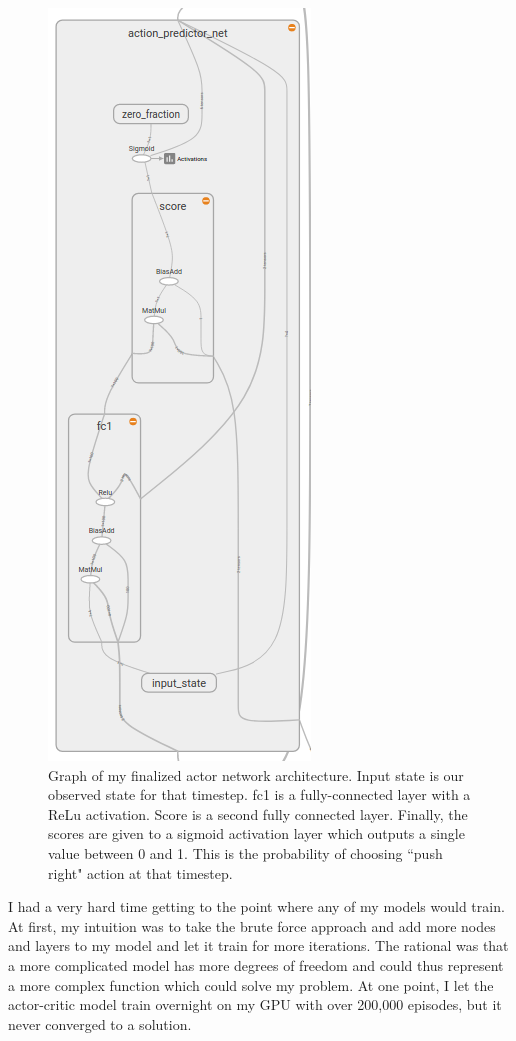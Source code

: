 \documentclass[12pt,a4paper]{article}
\begin{document}
\begin{figure}[htbp]
\begin{center}
\includegraphics[scale=0.66]{actor_net.png}
\caption{Graph of my finalized actor network architecture. Input state is our observed state for that timestep. fc1 is a fully-connected layer with a ReLu activation. Score is a second fully connected layer. Finally, the scores are given to a sigmoid activation layer which outputs a single value between 0 and 1. This is the probability of choosing ``push right" action at that timestep.}
\label{actor_net}
\end{center}
\end{figure}


I had a very hard time getting to the point where any of my models would train. At first, my intuition was to take the brute force approach and add more nodes and layers to my model and let it train for more iterations. The rational was that a more complicated model has more degrees of freedom and could thus represent a more complex function which could solve my problem. At one point, I let the actor-critic model train overnight on my GPU with over 200,000 episodes, but it never converged to a solution.
\end{document}
